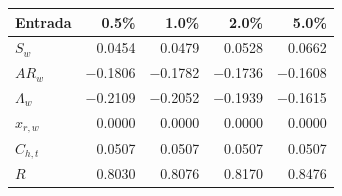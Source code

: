 \begin{tabular}{lrrrr}
\toprule
Entrada & 0.5\% & 1.0\% & 2.0\% & 5.0\% \\
\midrule
$S_w$ & 0.0454 & 0.0479 & 0.0528 & 0.0662 \\
$AR_w$ & $-$0.1806 & $-$0.1782 & $-$0.1736 & $-$0.1608 \\
$\Lambda_w$ & $-$0.2109 & $-$0.2052 & $-$0.1939 & $-$0.1615 \\
$x_{r,w}$ & 0.0000 & 0.0000 & 0.0000 & 0.0000 \\
$C_{h,t}$ & 0.0507 & 0.0507 & 0.0507 & 0.0507 \\
$R$ & 0.8030 & 0.8076 & 0.8170 & 0.8476 \\
\bottomrule
\end{tabular}